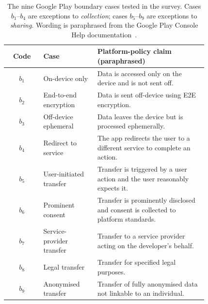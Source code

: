 \begin{table}[!htbp]
\centering\small
\caption{The nine Google Play boundary cases tested in the survey. Cases $b_1$--$b_4$
are exceptions to \emph{collection}; cases $b_5$--$b_9$ are exceptions to \emph{sharing}.
Wording is paraphrased from the Google Play Console Help documentation~\citep{google:data:safety:2022}.}
\label{tab:boundary-cases}
\renewcommand{\arraystretch}{1.15}
\begin{tabular}{c p{0.27\linewidth} p{0.55\linewidth}}
\toprule
\textbf{Code} & \textbf{Case} & \textbf{Platform-policy claim (paraphrased)} \\
\midrule
$b_1$ & On-device only & Data is accessed only on the device and is not sent off. \\
$b_2$ & End-to-end encryption & Data is sent off-device using E2E encryption. \\
$b_3$ & Off-device ephemeral & Data leaves the device but is processed ephemerally. \\
$b_4$ & Redirect to service & The app redirects the user to a different service to complete an action. \\
\midrule
$b_5$ & User-initiated transfer & Transfer is triggered by a user action and the user reasonably expects it. \\
$b_6$ & Prominent consent & Transfer is prominently disclosed and consent is collected to platform standards. \\
$b_7$ & Service-provider transfer & Transfer to a service provider acting on the developer's behalf. \\
$b_8$ & Legal transfer & Transfer for specified legal purposes. \\
$b_9$ & Anonymised transfer & Transfer of fully anonymised data not linkable to an individual. \\
\bottomrule
\end{tabular}
\end{table}
